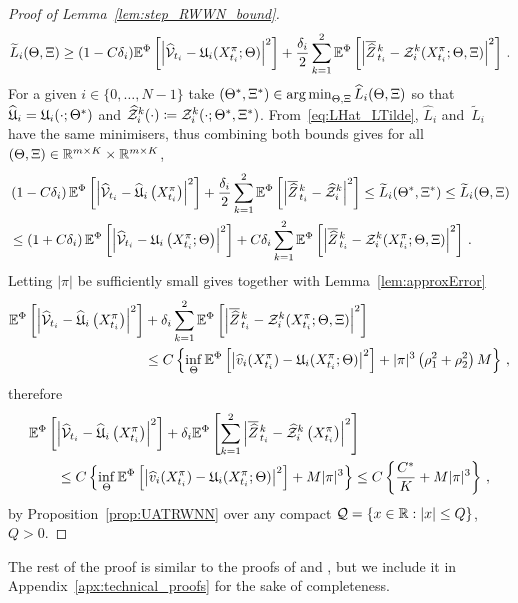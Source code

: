 \begin{proof}[Proof of Lemma~\ref{lem:step_RWWN_bound}]
    \[
        \widetilde{L}_i(\Theta, \Xi) \geq (1-C\delta_{i} )\mathbb{E}^\Phi\left[\left\lvert \widehat {\mathcal{V}}_{t_i} - \mathfrak{U}_i(X^\pi_{t_i}; \Theta)\right\rvert^2\right] + \frac{\delta_{i}}2\sum_{k=1}^2\mathbb{E}^\Phi\left[ \left\lvert \overline{\widehat{Z}}\kern0.1em^{k}_{t_{i}} - \mathcal{Z}_i^k(X^\pi_{t_i}; \Theta, \Xi)\right\rvert^2\right]\,.
    \]
For a given $i\in\{0,\dots,N-1\}$ take $(\Theta^*, \Xi^*)\in\operatorname*{arg\,min}_{\Theta, \Xi} \widehat{L}_i(\Theta, \Xi)$ so that $\widehat{\mathfrak{U}}_i=\mathfrak{U}_i(\cdot; \Theta^*)$ and $\widehat{\mathcal{Z}}_i^k(\cdot) \coloneqq  \mathcal{Z}^k_i(\cdot; \Theta^*, \Xi^*)$. 
    From~\eqref{eq:LHat_LTilde}, $\widehat{L}_i$ and~$\widetilde{L}_i$ have the same minimisers, thus combining both bounds gives for all $(\Theta,\Xi)\in\mathbb{R}^{m\times K}\times\mathbb{R}^{m\times K}$,
    \begin{align*}
            &\left(1-C \delta_{i} \right) \mathbb{E}^\Phi\left[\left|\widehat {\mathcal{V}}_{t_{i}}-\widehat{\mathfrak{U}}_{i}\left(X^\pi_{t_{i}}\right)\right|^{2}\right]+\frac{\delta_{i}}2\sum_{k=1}^2\mathbb{E}^\Phi\left[ \left\lvert \overline{\widehat{Z}}\kern0.1em^{k}_{t_{i}} - \widehat{\mathcal{Z}}_i^k\right\rvert^2\right] \leq \widetilde{L}_i(\Theta^*,\Xi^*)\leq \widetilde{L}_{i}(\Theta, \Xi) \\
            &\leq\left(1+C \delta_{i} \right) \mathbb{E}^\Phi\left[\left|\widehat {\mathcal{V}}_{t_{i}}-\mathfrak{U}_{i}\left(X^\pi_{t_{i}} ; \Theta\right)\right|^{2}\right]+C \delta_{i} \sum_{k=1}^2\mathbb{E}^\Phi\left[ \left\lvert \overline{\widehat{Z}}\kern0.1em^{k}_{t_{i}} - \mathcal{Z}_i^k(X^\pi_{t_i}; \Theta, \Xi)\right\rvert^2\right]\,.
    \end{align*}
    Letting $|\pi|$ be sufficiently small gives together with Lemma~\ref{lem:approxError}
    \begin{align*}
        \mathbb{E}^\Phi\left[\left|\widehat {\mathcal{V}}_{t_{i}}-\widehat{\mathfrak{U}}_{i}\left(X^\pi_{t_{i}}\right)\right|^{2}\right] &+ \delta_{i}  \sum_{k=1}^2\mathbb{E}^\Phi\left[ \left\lvert \overline{\widehat{Z}}\kern0.1em^{k}_{t_{i}} - \mathcal{Z}_i^k(X^\pi_{t_i}; \Theta, \Xi)\right\rvert^2\right] \\ 
        &\leq C \left\{\inf_\Theta\mathbb{E}^\Phi\left[\left|\widehat v_i(X^\pi_{t_i})-\mathfrak{U}_i(X^\pi_{t_i}; \Theta)\right|^2\right]
         + |\pi|^3\left(\rho_1^2  + \rho_2^2\right)M\right\}\,,
    \end{align*}
    therefore
    \begin{align*}
    &\mathbb{E}^\Phi\left[\left|\widehat{\mathcal{V}}_{t_{i}}-\widehat{\mathfrak{U}}_{i}\left(X^\pi_{t_{i}}\right)\right|^{2}\right] + \delta_{i}  \mathbb{E}^\Phi\left[\sum_{k=1}^2\left|\overline{\widehat{Z}}\kern0.1em^{k}_{t_{i}}-\widehat{\mathcal{Z}}^k_{i}\left(X^\pi_{t_{i}}\right)\right|^{2}\right] \\
    & \qquad \leq C\left\{ \inf_\Theta\mathbb{E}^\Phi\left[\left|\widehat v_i(X^\pi_{t_i})-\mathfrak{U}_i(X^\pi_{t_i}; \Theta)\right|^2\right]
    + M|\pi|^3 \right\}
    \leq C\left\{ \frac{C^{*}}{K}  + M|\pi|^3 \right\}\,,
    \end{align*}
    by Proposition~\ref{prop:UATRWNN} over any compact $\mathcal{Q} = \{x\in\mathbb{R}: |x|\leq Q\}$, $Q>0$.
\end{proof}
The rest of the proof is similar to the proofs of \cite[Theorem A.2]{Bayer2022PricingSPDEs} and \cite[Theorem~4.1]{Hure2020DeepPDEs}, but we include it in Appendix~\ref{apx:technical_proofs} for the sake of completeness. 

